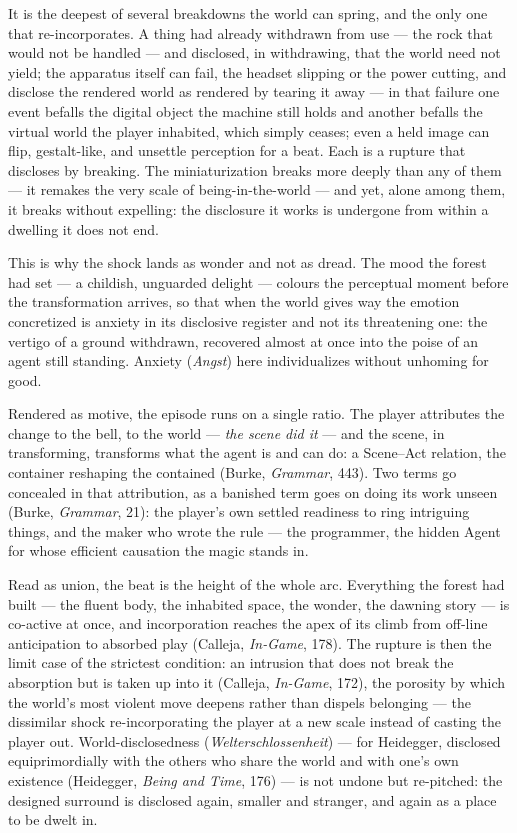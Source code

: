 It is the deepest of several breakdowns the world can spring, and the only one that re-incorporates. A thing had already withdrawn from use — the rock that would not be handled — and disclosed, in withdrawing, that the world need not yield; the apparatus itself can fail, the headset slipping or the power cutting, and disclose the rendered world as rendered by tearing it away — in that failure one event befalls the digital object the machine still holds and another befalls the virtual world the player inhabited, which simply ceases; even a held image can flip, gestalt-like, and unsettle perception for a beat. Each is a rupture that discloses by breaking. The miniaturization breaks more deeply than any of them — it remakes the very scale of being-in-the-world — and yet, alone among them, it breaks without expelling: the disclosure it works is undergone from within a dwelling it does not end.

This is why the shock lands as wonder and not as dread. The mood the forest had set — a childish, unguarded delight — colours the perceptual moment before the transformation arrives, so that when the world gives way the emotion concretized is anxiety in its disclosive register and not its threatening one: the vertigo of a ground withdrawn, recovered almost at once into the poise of an agent still standing. Anxiety (\textit{Angst}) here individualizes without unhoming for good.

Rendered as motive, the episode runs on a single ratio. The player attributes the change to the bell, to the world — \textit{the scene did it} — and the scene, in transforming, transforms what the agent is and can do: a Scene–Act relation, the container reshaping the contained (Burke, \textit{Grammar}, 443). Two terms go concealed in that attribution, as a banished term goes on doing its work unseen (Burke, \textit{Grammar}, 21): the player's own settled readiness to ring intriguing things, and the maker who wrote the rule — the programmer, the hidden Agent for whose efficient causation the magic stands in.

Read as union, the beat is the height of the whole arc. Everything the forest had built — the fluent body, the inhabited space, the wonder, the dawning story — is co-active at once, and incorporation reaches the apex of its climb from off-line anticipation to absorbed play (Calleja, \textit{In-Game}, 178). The rupture is then the limit case of the strictest condition: an intrusion that does not break the absorption but is taken up into it (Calleja, \textit{In-Game}, 172), the porosity by which the world's most violent move deepens rather than dispels belonging — the dissimilar shock re-incorporating the player at a new scale instead of casting the player out. World-disclosedness (\textit{Welterschlossenheit}) — for Heidegger, disclosed equiprimordially with the others who share the world and with one's own existence (Heidegger, \textit{Being and Time}, 176) — is not undone but re-pitched: the designed surround is disclosed again, smaller and stranger, and again as a place to be dwelt in.

